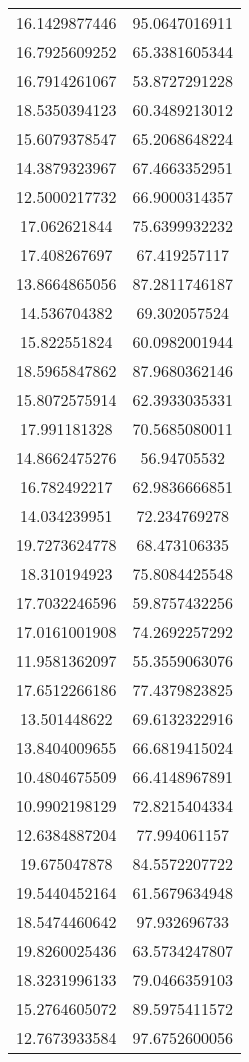 \begin{table}
\begin{tabular}{cc}
16.1429877446 & 95.0647016911 \\
16.7925609252 & 65.3381605344 \\
16.7914261067 & 53.8727291228 \\
18.5350394123 & 60.3489213012 \\
15.6079378547 & 65.2068648224 \\
14.3879323967 & 67.4663352951 \\
12.5000217732 & 66.9000314357 \\
17.062621844 & 75.6399932232 \\
17.408267697 & 67.419257117 \\
13.8664865056 & 87.2811746187 \\
14.536704382 & 69.302057524 \\
15.822551824 & 60.0982001944 \\
18.5965847862 & 87.9680362146 \\
15.8072575914 & 62.3933035331 \\
17.991181328 & 70.5685080011 \\
14.8662475276 & 56.94705532 \\
16.782492217 & 62.9836666851 \\
14.034239951 & 72.234769278 \\
19.7273624778 & 68.473106335 \\
18.310194923 & 75.8084425548 \\
17.7032246596 & 59.8757432256 \\
17.0161001908 & 74.2692257292 \\
11.9581362097 & 55.3559063076 \\
17.6512266186 & 77.4379823825 \\
13.501448622 & 69.6132322916 \\
13.8404009655 & 66.6819415024 \\
10.4804675509 & 66.4148967891 \\
10.9902198129 & 72.8215404334 \\
12.6384887204 & 77.994061157 \\
19.675047878 & 84.5572207722 \\
19.5440452164 & 61.5679634948 \\
18.5474460642 & 97.932696733 \\
19.8260025436 & 63.5734247807 \\
18.3231996133 & 79.0466359103 \\
15.2764605072 & 89.5975411572 \\
12.7673933584 & 97.6752600056 \\

\end{tabular}
\end{table}
